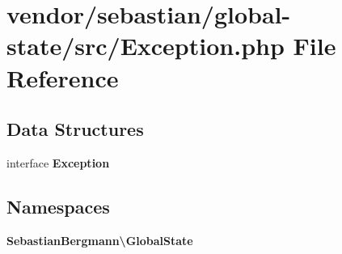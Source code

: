 \section{vendor/sebastian/global-\/state/src/\+Exception.php File Reference}
\label{sebastian_2global-state_2src_2_exception_8php}
\subsection*{Data Structures}
\begin{DoxyCompactItemize}
\item 
interface {\bf Exception}
\end{DoxyCompactItemize}
\subsection*{Namespaces}
\begin{DoxyCompactItemize}
\item 
 {\bf Sebastian\+Bergmann\textbackslash{}\+Global\+State}
\end{DoxyCompactItemize}
